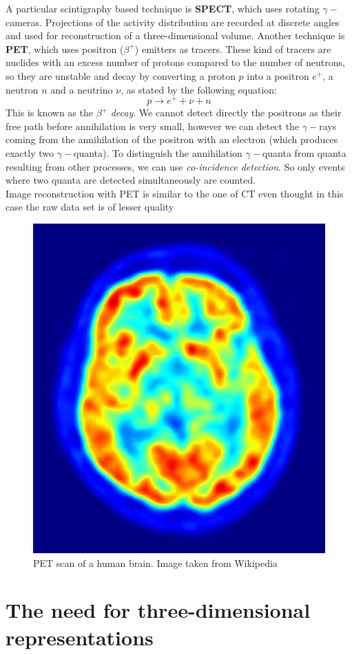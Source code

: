 A particular scintigraphy based technique is \textbf{SPECT}, which uses rotating $\gamma-$cameras. Projections of the activity distribution are recorded at discrete angles and used for reconstruction of a three-dimensional volume. Another technique is \textbf{PET}, which uses positron ($\beta^{+}$) emitters as tracers. These kind of tracers are nuclides with an excess number of protons compared to the number of neutrons, so they are unstable and decay by converting a proton $p$ into a positron $e^{+}$, a neutron $n$ and a neutrino $\nu$, as stated by the following equation:
\begin{equation}
 p \rightarrow e^{+} + \nu + n
\end{equation}
This is known as the $\beta^{+}$ \textit{decay}. We cannot detect directly the positrons as their free path before annihilation is very small, however we can detect the $\gamma-$rays coming from the annihilation of the positron with an electron (which produces exactly two $\gamma-$quanta). To distinguish the annihilation $\gamma-$quanta from quanta resulting from other processes, we can use \textit{co-incidence detection}. So only events where two quanta are detected simultaneously are counted.\\

Image reconstruction with PET is similar to the one of CT even thought in this case the raw data set is of lesser quality

\begin{figure}[htb] %
   \centering
   \includegraphics[width=0.30\linewidth]{images/PET.jpg}
   \caption[PET scan of a brain]{PET scan of a human brain. Image taken from Wikipedia}
   \label{fig:pet}
\end{figure}

\section{The need for three-dimensional representations}\label{sec13:3drepresentations}

